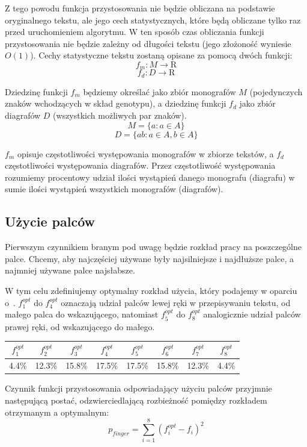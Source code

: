 \documentclass[brudnopis]{xmgr}
\begin{document}
Z tego powodu funkcja przystosowania nie będzie obliczana na podstawie oryginalnego tekstu, ale jego cech statystycznych, które będą obliczane tylko raz przed uruchomieniem algorytmu. W ten sposób czas obliczania funkcji przystosowania nie będzie zależny od długości tekstu (jego złożoność wyniesie $ O(1) $). Cechy statystyczne tekstu zostaną opisane za pomocą dwóch funkcji:
$$ f_m : M \rightarrow \mathrm{R} $$
$$ f_d : D \rightarrow \mathrm{R} $$

Dziedzinę funkcji $ f_m $ będziemy określać jako zbiór monografów $ M $ (pojedynczych znaków wchodzących w skład genotypu), a dziedzinę funkcji $ f_d $ jako zbiór diagrafów $ D $ (wszystkich możliwych par znaków).
$$ M = \{ a : a \in A \} $$
$$ D = \{ ab : a \in A, b \in A \} $$

$ f_m $ opisuje częstotliwości występowania monografów w zbiorze tekstów, a $ f_d $ częstotliwości występowania diagrafów. Przez częstotliwość występowania rozumiemy procentowy udział ilości wystąpień danego monografu (diagrafu) w sumie ilości wystąpień wszystkich monografów (diagrafów).


\subsection{Użycie palców}

Pierwszym czynnikiem branym pod uwagę będzie rozkład pracy na poszczególne palce. Chcemy, aby najczęściej używane były najsilniejsze i najdłuższe palce, a najmniej używane palce najsłabsze.

W tym celu zdefiniujemy optymalny rozkład użycia, który podajemy w oparciu o~\cite{AntColony:2002:ACO}. $f^{opt}_1$ do $f^{opt}_4$ oznaczają udział palców lewej ręki w przepisywaniu tekstu, od małego palca do wskazującego, natomiast $f^{opt}_5$ do $f^{opt}_8$ analogicznie udział palców prawej ręki, od wskazującego do małego.\newline

\begin{tabular}{ c | c | c | c | c | c | c | c }
  $f^{opt}_1$ & $f^{opt}_2$ & $f^{opt}_3$ & $f^{opt}_4$ & $f^{opt}_5$ & $f^{opt}_6$ & $f^{opt}_7$ & $f^{opt}_8$ \\
  \hline
  4.4\% & 12.3\% & 15.8\% & 17.5\% & 17.5\% & 15.8\% & 12.3\% & 4.4\% \\
\end{tabular}\newline

Czynnik funkcji przystosowania odpowiadający użyciu palców przyjmnie następującą postać, odzwierciedlającą rozbieżność pomiędzy rozkładem otrzymanym a optymalnym:
$$ p_{finger} = \sum\limits_{i = 1}^{8} (f_i^{opt} - f_i)^2 $$
\end{document}
